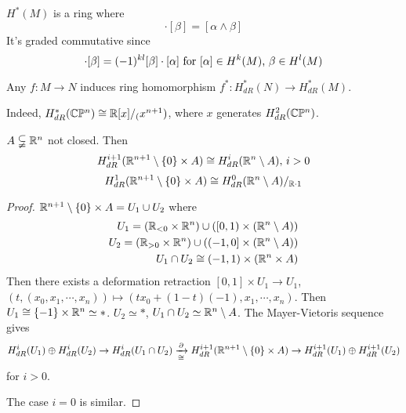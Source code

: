 \begin{remark}
     $ H^*(M ) $ is a ring where 
     \begin{equation}
        [\alpha]\cdot[\beta]=[\alpha\wedge \beta]
     \end{equation}
    It's graded commutative since 
    \begin{equation}
        [\alpha]\cdot[\beta]=(-1)^{kl}[\beta]\cdot[\alpha]\text{ for  $ [\alpha]\in H^k(M) $, $ \beta\in H^{l}(M) $}
    \end{equation}
    
    Any  $ f:M\rightarrow N     $ induces ring homomorphism  $ f^*:H^*_{dR}(N)\rightarrow H^*_{dR}(M) $.

    Indeed,  $ H_{dR}^*(\mathbb C\mathbb P^n)\cong\mathbb R[x]/_(x^{n+1}) $, where $ x  $ generates  $ H_{dR}^2(\mathbb C\mathbb P^n) $.
\end{remark}

\begin{proposition}\label{inductive prop in de-rham}
     $ A\subsetneqq \mathbb R^n $ not closed. Then 
     \begin{equation}
        H_{dR}^{i+1}(\mathbb R^{n+1}\setminus\{0\}\times A)\cong H^i_{dR}(\mathbb R^n\setminus A),\, i>0
     \end{equation}
     \begin{equation}
        H^1_{dR}(\mathbb R^{n+1}\setminus\{0\}\times A)\cong H_{dR}^0(\mathbb R^n\setminus A)/_{\mathbb R\cdot 1}
     \end{equation}
\end{proposition}
\begin{proof}
     $ \mathbb R^{n+1}\setminus\{0\}\times A=U_1\cup U_2 $ where 
     \begin{equation*}
        \begin{aligned}
            U_1=(\mathbb R_{<0}\times \mathbb R^n)\cup ([0,1)\times(\mathbb R^n\setminus A))\\
            U_2=(\mathbb R_{>0}\times \mathbb R^n)\cup((-1,0]\times(\mathbb R^n\setminus A))\\
            U_1\cap U_2\cong (-1,1)\times (\mathbb R^n\times A)
        \end{aligned}
     \end{equation*} 
     Then there exists a deformation retraction  $ [0,1]\times U_1\rightarrow U_1 $, $ (t,(x_0,x_1,\cdots,x_n))\mapsto (tx_0+(1-t)(-1),x_1,\cdots,x_n)  $. Then  $ U_1\cong\{-1\}\times \mathbb R^n\simeq * $.  $ U_2\simeq * $,  $ U_1\cap U_2\simeq \mathbb R^n\setminus A $. The Mayer-Vietoris sequence gives 
 \begin{equation*}
   H^i_{dR}(U_1)\oplus H_{dR}^i(U_2)\rightarrow H_{dR}^i(U_1\cap U_2)\xrightarrow[\cong]{\partial}H_{dR}^{i+1}(\mathbb R^{n+1}\setminus\{0\}\times A)\rightarrow H_{dR}^{i+1}(U_1)\oplus H_{dR}^{i+1}(U_2)
 \end{equation*} 
for  $ i>0 $. 

The case  $ i=0 $ is similar. 
\end{proof}

